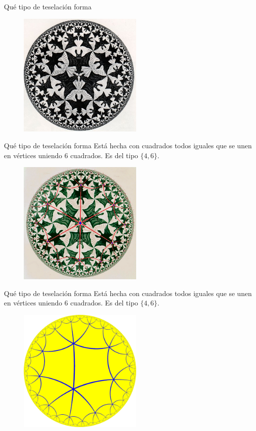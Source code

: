 \documentclass[compress]{beamer}
\begin{document}
\begin{frame}{Qué tipo de teselación forma}
  \begin{figure}[ht!]
    \centering
    \includegraphics[width=60mm]{./limit2.jpg}
  \end{figure}
\end{frame}

\begin{frame}{Qué tipo de teselación forma}
  Está hecha con cuadrados todos iguales que se unen en
  vértices uniendo $6$ cuadrados. Es del tipo $\{4,6\}$.
  
  \begin{figure}[ht!]
    \centering
    \includegraphics[width=60mm]{./angels.png}
  \end{figure}
\end{frame}

\begin{frame}{Qué tipo de teselación forma}
  Está hecha con cuadrados todos iguales que se unen en
  vértices uniendo $6$ cuadrados. Es del tipo $\{4,6\}$.
  
  \begin{figure}[ht!]
    \centering
    \includegraphics[width=60mm]{./tiling-4-6.png}
  \end{figure}
\end{frame}
\end{document}
